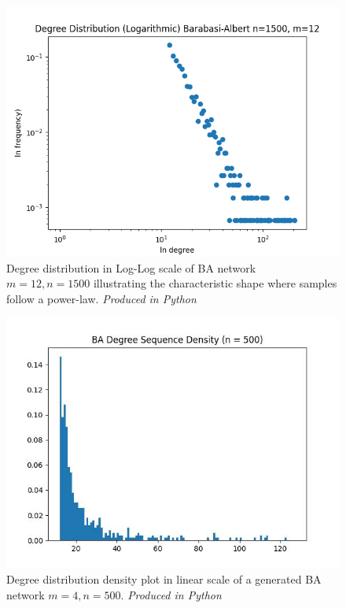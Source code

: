 \documentclass[
	a4paper, %
	10pt, %
	unnumberedsections, %
	twoside, %
]{LTJournalArticle}
\begin{document}
\begin{figure}[H] %
	\includegraphics[width=\linewidth]{Figures/ba/degree_dist_log.png}
	\caption{Degree distribution in Log-Log scale of BA network \(m=12, n=1500\) illustrating the characteristic shape where samples follow a power-law.  \emph{Produced in Python}}
	\label{fig:dist_loglog}
\end{figure}


\begin{figure}[H] %
	\includegraphics[width=\linewidth]{Figures/ba/degree_dist_density.jpg}
	\caption{Degree distribution density plot in linear scale of a generated BA network \(m=4, n=500\). \emph{Produced in Python}}
	\label{fig:sf_degree_density}
\end{figure}
\end{document}
